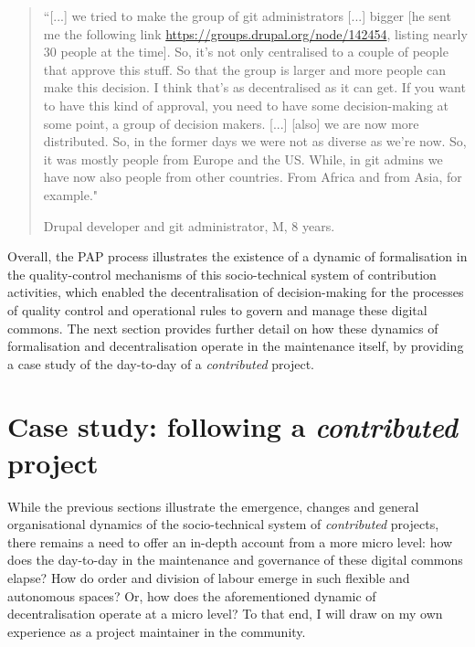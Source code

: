 \begin{quotation}
``[...] we tried to make the group of git administrators [...] bigger [he sent me the following link \url{https://groups.drupal.org/node/142454}, listing nearly 30 people at the time]. So, it's not only centralised to a couple of people that approve this stuff. So that the group is larger and more people can make this decision. I think that's as decentralised as it can get. If you want to have this kind of approval, you need to have some decision-making at some point, a group of decision makers. [...] [also] we are now more distributed. So, in the former days we were not as diverse as we're now. So, it was mostly people from Europe and the US. While, in git admins we have now also people from other countries. From Africa and from Asia, for example."
\begin{flushright}\footnotesize{Drupal developer and git administrator, M, 8 years.}\end{flushright}
\end{quotation}

Overall, the PAP process illustrates the existence of a dynamic of formalisation in the quality-control mechanisms of this socio-technical system of contribution activities, which enabled the decentralisation of decision-making for the processes of quality control and operational rules to govern and manage these digital commons. The next section provides further detail on how these dynamics of formalisation and decentralisation operate in the maintenance itself, by providing a case study of the day-to-day of a \textit{contributed} project.

\section{Case study: following a \textit{contributed} project}
\label{subsec:contrib-day-by-day}

While the previous sections illustrate the emergence, changes and general organisational dynamics of the socio-technical system of \textit{contributed} projects, there remains a need to offer an in-depth account from a more micro level: how does the day-to-day in the maintenance and governance of these digital commons elapse? How do order and division of labour emerge in such flexible and autonomous spaces? Or, how does the aforementioned dynamic of decentralisation operate at a micro level? To that end, I will draw on my own experience as a project maintainer in the community.

